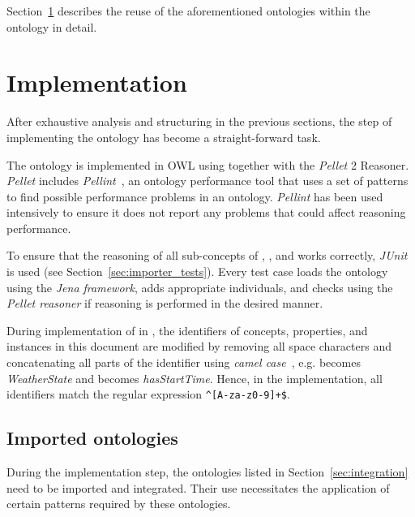 Section~\ref{sec:implementation} describes the reuse of the aforementioned ontologies within the \smarthomeweather ontology in detail.

\section{Implementation}
\label{sec:implementation}


After exhaustive analysis and structuring in the previous sections, the step of implementing the ontology has become a straight-forward task.

The \smarthomeweather ontology is implemented in OWL using  together with the \emph{Pellet}  2 Reasoner. \emph{Pellet} includes \emph{Pellint}~\cite{pellint}, an ontology performance tool that uses a set of patterns to find possible performance problems in an  ontology. \emph{Pellint} has been used intensively to ensure it does not report any problems that could affect reasoning performance.

To ensure that the reasoning of all sub-concepts of , , and  works correctly, \emph{JUnit}~\cite{junit} is used (see Section~\ref{sec:importer_tests}). Every test case loads the \smarthomeweather ontology using the \emph{Jena framework}, adds appropriate individuals, and checks using the \emph{Pellet reasoner} if reasoning is performed in the desired manner.

During implementation of \smarthomeweather in , the identifiers of concepts, properties, and instances in this document are modified by removing all space characters and concatenating all parts of the identifier using \emph{camel case}~\cite{CamelCase}, e.g.  becomes \emph{WeatherState} and  becomes \emph{hasStartTime}. Hence, in the  implementation, all identifiers match the regular expression \texttt{\textasciicircum[A-za-z0-9]+\$}.

\subsection{Imported ontologies}
\label{sec:ontology_imports}

During the implementation step, the ontologies listed in Section~\ref{sec:integration} need to be imported and integrated. Their use necessitates the application of certain patterns required by these ontologies.

